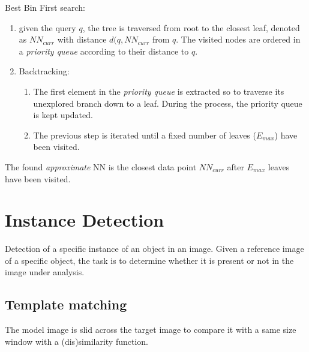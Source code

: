 \documentclass{article}
\begin{document}
Best Bin First search:
\begin{enumerate}
    \item given the query $q$, the tree is traversed from root to the closest leaf, denoted as $NN_{curr}$ with distance $d(q,NN_{curr}$ from $q$. The visited nodes are ordered in a \emph{priority queue} according to their distance to $q$. 
    \item Backtracking:
        \begin{enumerate}
            \item The first element in the \emph{priority queue} is extracted so to traverse its unexplored branch down to a leaf. During the process, the priority queue is kept updated. 
            \item The previous step is iterated until a fixed number of leaves ($E_{max}$) have been visited.
        \end{enumerate}
\end{enumerate}
The found \emph{approximate} NN is the closest data point $NN_{curr}$ after $E_{max}$ leaves have been visited.

\section{Instance Detection}
Detection of a specific instance of an object in an image. Given a reference image of a specific object, the task is to determine whether it is present or not in the image under analysis.

\subsection{Template matching}
The model image is slid across the target image to compare it with a same size window with a (dis)similarity function.
\end{document}
